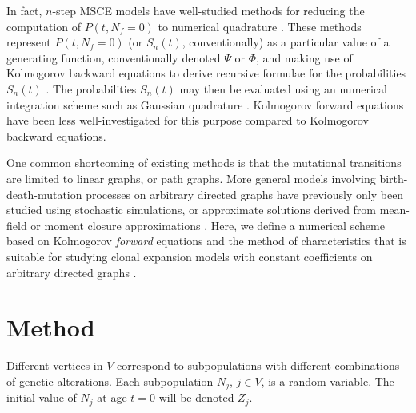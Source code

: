\documentclass{article}
\begin{document}
In fact, $n$-step MSCE models have well-studied methods
for reducing the computation of $P(t,N_f = 0)$ to numerical quadrature
\cite{moolgavkar1992multistage,crump2005numerical,meza2008age,luebeck2013impact}.
These methods represent $P(t,N_f = 0)$ (or $S_n(t)$,
conventionally) as a particular value of a generating function, conventionally 
denoted $\Psi$ or $\Phi$, and making use of Kolmogorov backward equations to derive
recursive formulae for the probabilities $S_n(t)$
\cite{crump2005numerical,moolgavkar1979two}. The probabilities $S_n(t)$ may then
be evaluated using an numerical integration scheme such as Gaussian quadrature
\cite{luebeck2013impact}. Kolmogorov forward equations have been less
well-investigated for this purpose compared to Kolmogorov backward equations.


One common shortcoming of existing methods is that the mutational transitions are 
limited to linear graphs, or path graphs. More general models involving
birth-death-mutation processes on arbitrary directed graphs have previously only
been studied using stochastic simulations, or approximate solutions derived
from mean-field or moment closure approximations
\cite{patersonbozic2020colorectal,grima2010effective}.
Here, we define a numerical scheme based on Kolmogorov \emph{forward} equations
and the method of characteristics that is suitable for studying clonal expansion
models with constant coefficients on
arbitrary directed graphs \cite{crump2005numerical,quinn1989calculating}.

\section{Method}


Different vertices in $V$ correspond to subpopulations with different
combinations of genetic alterations. Each subpopulation $N_j$, $j \in V$, is a
random variable. The initial value of $N_j$ at age $t=0$ will be denoted $Z_j$.
\end{document}
